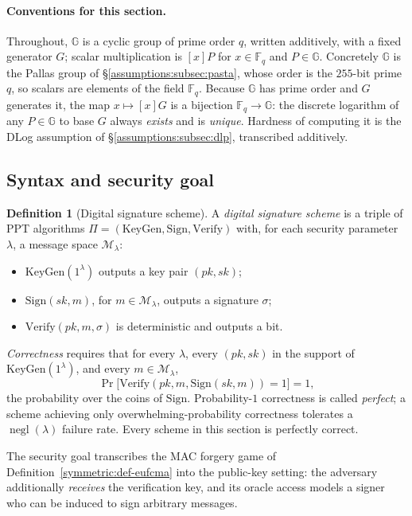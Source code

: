 \documentclass[11pt,a4paper]{article}
\theoremstyle{definition}
\newtheorem{definition}[theorem]{Definition}
\theoremstyle{remark}
\newcommand{\G}{\ensuremath{\mathbb{G}}}
\newcommand{\Fq}{\ensuremath{\mathbb{F}_{q}}}
\DeclareMathOperator{\negl}{negl}
\begin{document}
\paragraph{Conventions for this section.}
Throughout, \(\G\) is a cyclic group of prime order \(q\), written
additively, with a fixed generator \(G\); scalar multiplication is
\([x]P\) for \(x \in \Fq\) and \(P \in \G\). Concretely \(\G\) is the
Pallas group of \S\ref{assumptions:subsec:pasta}, whose order is the
\(255\)-bit prime \(q\), so scalars are elements of the field \(\Fq\).
Because \(\G\) has prime order and \(G\) generates it, the map
\(x \mapsto [x]G\) is a bijection \(\Fq \to \G\): the discrete
logarithm of any \(P \in \G\) to base \(G\) always \emph{exists} and
is \emph{unique}. Hardness of computing it is the DLog assumption of
\S\ref{assumptions:subsec:dlp}, transcribed additively.

\subsection{Syntax and security goal}\label{signatures:subsec:syntax}

\begin{definition}[Digital signature scheme]\label{signatures:def:scheme}
A \emph{digital signature scheme} is a triple of PPT algorithms
\(\Pi = (\mathrm{KeyGen}, \mathrm{Sign}, \mathrm{Verify})\) with, for
each security parameter \(\lambda\), a message space
\(\mathcal M_\lambda\):
\begin{itemize}
\item \(\mathrm{KeyGen}(1^{\lambda})\) outputs a key pair
  \((pk, sk)\);
\item \(\mathrm{Sign}(sk, m)\), for \(m \in \mathcal M_\lambda\),
  outputs a signature \(\sigma\);
\item \(\mathrm{Verify}(pk, m, \sigma)\) is deterministic and
  outputs a bit.
\end{itemize}
\emph{Correctness} requires that for every \(\lambda\), every
\((pk, sk)\) in the support of \(\mathrm{KeyGen}(1^{\lambda})\), and
every \(m \in \mathcal M_\lambda\),
\[
\Pr\bigl[\mathrm{Verify}(pk, m, \mathrm{Sign}(sk, m)) = 1\bigr] = 1,
\]
the probability over the coins of \(\mathrm{Sign}\).
Probability-\(1\) correctness is called \emph{perfect}; a scheme
achieving only overwhelming-probability correctness tolerates a
\(\negl(\lambda)\) failure rate. Every scheme in this section is
perfectly correct.
\end{definition}

The security goal transcribes the MAC forgery game of
Definition~\ref{symmetric:def-eufcma} into the public-key setting:
the adversary additionally \emph{receives} the verification key, and
its oracle access models a signer who can be induced to sign arbitrary
messages.
\end{document}
